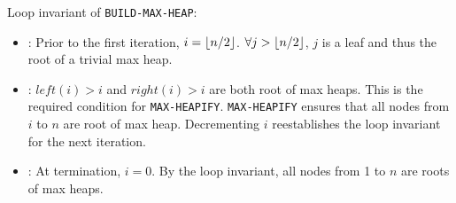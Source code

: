     \par Loop invariant of \texttt{BUILD-MAX-HEAP}:
    \begin{itemize}
      \item {}: Prior to the first iteration,
        $i = \lfloor n/2\rfloor$. $\forall j > \lfloor n/2\rfloor$, $j$ is a leaf and thus
        the root of a trivial max heap.
      \item {}: $left(i) > i$ and $right(i) > i$ are both root
        of max heaps. This is the required condition for \texttt{MAX-HEAPIFY}.
        \texttt{MAX-HEAPIFY} ensures that all nodes from $i$ to $n$ are root
        of max heap. Decrementing $i$ reestablishes the loop invariant for the
        next iteration.
      \item {}: At termination, $i = 0$. By the loop invariant,
        all nodes from 1 to $n$ are roots of max heaps.
    \end{itemize}

